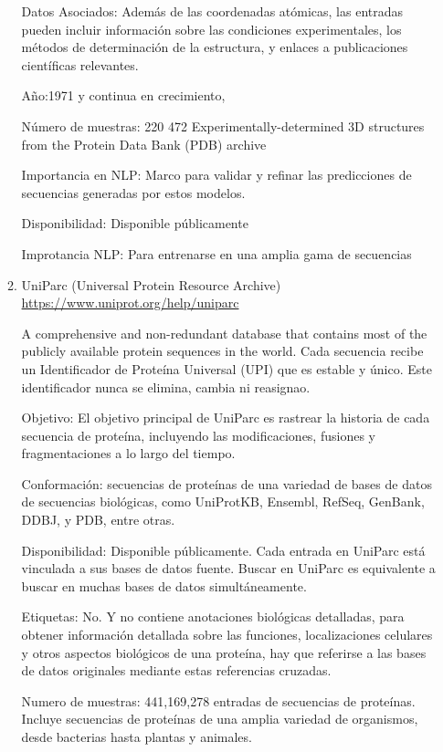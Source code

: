 \documentclass[11pt, twoside]{report}
\begin{document}
\begin{itemize}
\begin{enumerate}
	    Datos Asociados: Además de las coordenadas atómicas, las entradas pueden incluir información sobre las condiciones experimentales, los métodos de determinación de la estructura, y enlaces a publicaciones científicas relevantes.


        Año:1971 y continua en crecimiento, 
        
        Número de muestras: 220 472 Experimentally-determined 3D structures from the Protein Data Bank (PDB) archive

        Importancia en NLP: Marco para validar y refinar las predicciones de secuencias generadas por estos modelos.

        Disponibilidad: Disponible públicamente

        Improtancia NLP: Para entrenarse en una amplia gama de secuencias

       

        \item UniParc (Universal Protein Resource Archive) 
        \url{https://www.uniprot.org/help/uniparc}

        
        A comprehensive and non-redundant database that contains most of the publicly available protein sequences in the world. Cada secuencia recibe un Identificador de Proteína Universal (UPI) que es estable y único. Este identificador nunca se elimina, cambia ni reasignao.

        Objetivo: El objetivo principal de UniParc es rastrear la historia de cada secuencia de proteína, incluyendo las modificaciones, fusiones y fragmentaciones a lo largo del tiempo. 

        Conformación: secuencias de proteínas de una variedad de bases de datos de secuencias biológicas, como UniProtKB, Ensembl, RefSeq, GenBank, DDBJ, y PDB, entre otras.

        Disponibilidad: Disponible públicamente. Cada entrada en UniParc está vinculada a sus bases de datos fuente. Buscar en UniParc es equivalente a buscar en muchas bases de datos simultáneamente.

        Etiquetas: No. Y no contiene anotaciones biológicas detalladas, para obtener información detallada sobre las funciones, localizaciones celulares y otros aspectos biológicos de una proteína, hay que referirse a las bases de datos originales mediante estas referencias cruzadas.

        Numero de muestras: 441,169,278 entradas de secuencias de proteínas. Incluye secuencias de proteínas de una amplia variedad de organismos, desde bacterias hasta plantas y animales.


\end{enumerate}
\end{itemize}
\end{document}
